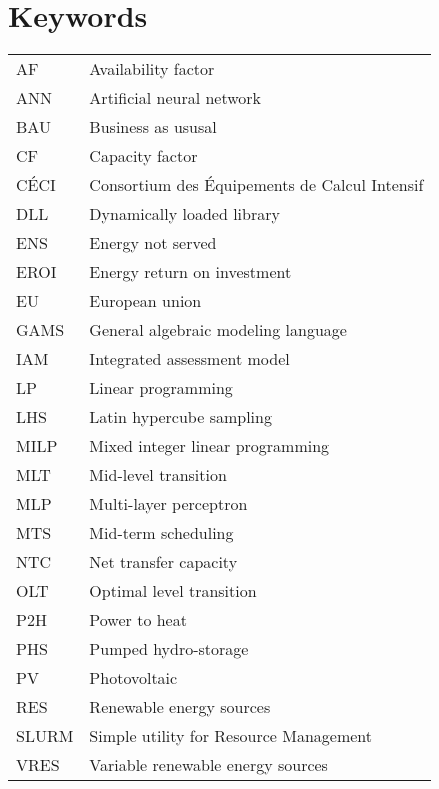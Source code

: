 \newpage

\tableofcontents

\newpage

\section*{Keywords}


\begin{table}[h!]
    \begin{tabular}{p{3cm} p{9cm}}
        AF & Availability factor \\
        ANN & Artificial neural network \\
        BAU & Business as ususal \\
        CF & Capacity factor \\
        CÉCI & Consortium des Équipements de Calcul Intensif \\
        DLL & Dynamically loaded library \\
        ENS & Energy not served \\
        EROI & Energy return on investment \\
        EU & European union \\
        GAMS & General algebraic modeling language \\
        IAM & Integrated assessment model \\
        LP & Linear programming \\
        LHS & Latin hypercube sampling \\
        MILP & Mixed integer linear programming \\
        MLT & Mid-level transition \\
        MLP & Multi-layer perceptron \\
        MTS & Mid-term scheduling \\
        NTC & Net transfer capacity \\
        OLT & Optimal level transition \\
        P2H & Power to heat \\
        PHS & Pumped hydro-storage \\
        PV & Photovoltaic \\
        RES & Renewable energy sources \\
        SLURM & Simple utility for Resource Management \\
        VRES & Variable renewable energy sources \\
    \end{tabular}
\end{table}

\newpage
